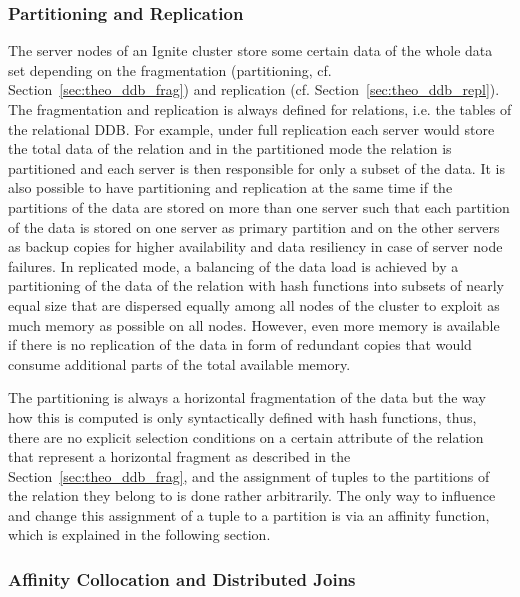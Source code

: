 \subsubsection{Partitioning and Replication}
\label{sec:meth_ign_panre}
The server nodes of an Ignite cluster store some certain data of the whole data set depending on the fragmentation (partitioning, cf.
Section~\ref{sec:theo_ddb_frag}) and replication (cf. Section~\ref{sec:theo_ddb_repl}). The fragmentation and replication is always defined for relations,
i.e. the tables of the relational DDB. For example, under full replication each server would store the total data of the relation and in the partitioned 
mode the relation is partitioned and each server is then responsible for only a subset of the data. It is also possible to have partitioning and 
replication at the same time if the partitions of the data are stored on more than one server such that each partition of the data is stored on one 
server as primary partition and on the other servers as backup copies for higher availability and data resiliency in case of server node failures. 
In replicated mode, a balancing of the data load is achieved by a partitioning of the data of the relation with hash functions into subsets of nearly 
equal size that are dispersed equally among all nodes of the cluster to exploit as much memory as possible on all nodes. However, even more memory is
available if there is no replication of the data in form of redundant copies that would consume additional parts of the total available memory. 

The partitioning is always a horizontal fragmentation of the data but the way how this is computed is only syntactically defined with hash functions, thus,
there are no explicit selection conditions on a certain attribute of the relation that represent a horizontal fragment as described in the
Section~\ref{sec:theo_ddb_frag}, and the assignment of tuples to the partitions of the relation they belong to is done rather arbitrarily. The only way to
influence and change this assignment of a tuple to a partition is via an affinity function, which is explained in the following section.



\subsubsection{Affinity Collocation and Distributed Joins}
\label{sec:meth_ign_affc}

